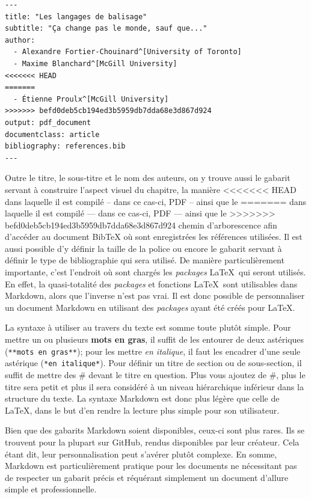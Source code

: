 \documentclass[
  letterpaper,
]{scrbook}
\begin{document}
\begin{verbatim}
---
title: "Les langages de balisage"
subtitle: "Ça change pas le monde, sauf que..."
author:
  - Alexandre Fortier-Chouinard^[University of Toronto]
  - Maxime Blanchard^[McGill University]
<<<<<<< HEAD
=======
  - Étienne Proulx^[McGill University]
>>>>>>> befd0deb5cb194ed3b5959db7dda68e3d867d924
output: pdf_document
documentclass: article
bibliography: references.bib
---
\end{verbatim}

Outre le titre, le sous-titre et le nom des auteurs, on y trouve aussi
le gabarit servant à construire l'aspect visuel du chapitre, la manière
<<<<<<< HEAD
dans laquelle il est compilé -- dans ce cas-ci, PDF -- ainsi que le
=======
dans laquelle il est compilé --- dans ce cas-ci, PDF --- ainsi que le
>>>>>>> befd0deb5cb194ed3b5959db7dda68e3d867d924
chemin d'arborescence afin d'accéder au document BibTeX où sont
enregistrées les références utilisées. Il est aussi possible d'y définir
la taille de la police ou encore le gabarit servant à définir le type de
bibliographie qui sera utilisé. De manière particulièrement importante,
c'est l'endroit où sont chargés les \emph{packages} \LaTeX~qui seront
utilisés. En effet, la quasi-totalité des \emph{packages} et fonctions
\LaTeX~sont utilisables dans Markdown, alors que l'inverse n'est pas
vrai. Il est donc possible de personnaliser un document Markdown en
utilisant des \emph{packages} ayant été créés pour \LaTeX.

La syntaxe à utiliser au travers du texte est somme toute plutôt simple.
Pour mettre un ou plusieurs \textbf{mots en gras}, il suffit de les
entourer de deux astériques (\texttt{**mots\ en\ gras**}); pour les
mettre \emph{en italique}, il faut les encadrer d'une seule astérique
(\texttt{*en\ italique*}). Pour définir un titre de section ou de
sous-section, il suffit de mettre des \# devant le titre en question.
Plus vous ajoutez de \#, plus le titre sera petit et plus il sera
considéré à un niveau hiérarchique inférieur dans la structure du texte.
La syntaxe Markdown est donc plus légère que celle de \LaTeX, dans le
but d'en rendre la lecture plus simple pour son utilisateur.

Bien que des gabarits Markdown soient disponibles, ceux-ci sont plus
rares. Ils se trouvent pour la plupart sur GitHub, rendus disponibles
par leur créateur. Cela étant dit, leur personnalisation peut s'avérer
plutôt complexe. En somme, Markdown est particulièrement pratique pour
les documents ne nécessitant pas de respecter un gabarit précis et
réquérant simplement un document d'allure simple et professionnelle.
\end{document}

